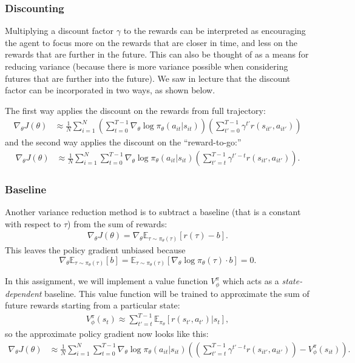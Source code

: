 \documentclass{article}
\begin{document}

\subsubsection{Discounting}
Multiplying a discount factor $\gamma$ to the rewards can be interpreted as encouraging the agent to focus more on the rewards that are closer in time, and less on the rewards that are further in the future. This can also be thought of as a means for reducing variance (because there is more variance possible when considering futures that are further into the future). We saw in lecture that the discount factor can be incorporated in two ways, as shown below.

The first way applies the discount on the rewards from full trajectory:
\begin{align} \label{discount_full}
\nabla_\theta J(\theta) &\approx \frac{1}{N} \sum_{i=1}^N \left(\sum_{t=0}^{T-1} \nabla_\theta \log \pi_\theta(a_{it} | s_{it})\right)\left(\sum_{t'=0}^{T-1} \gamma^{t'} r(s_{it'}, a_{it'})\right)
\end{align}
and the second way applies the discount on the ``reward-to-go:''
\begin{align} \label{discount_rtg}
\nabla_\theta J(\theta) &\approx \frac{1}{N} \sum_{i=1}^N \sum_{t=0}^{T-1} \nabla_\theta \log \pi_\theta(a_{it} | s_{it})\left(\sum_{t'=t}^{T-1} \gamma^{t'-t} r(s_{it'}, a_{it'})\right).
\end{align}


\subsubsection{Baseline}
Another variance reduction method is to subtract a baseline (that is a constant with respect to $\tau$) from the sum of rewards:
\begin{align} \label{constant_wrt_tau}
\nabla_\theta J(\theta) = \nabla_\theta \mathbb{E}_{\tau \sim \pi_\theta(\tau)} \left[r(\tau) - b\right].
\end{align}
This leaves the policy gradient unbiased because $$\nabla_\theta \mathbb{E}_{\tau \sim \pi_\theta(\tau)} \left[b\right] = \mathbb{E}_{\tau \sim \pi_\theta(\tau)} \left[\nabla_\theta \log \pi_\theta(\tau) \cdot b\right] = 0.$$

In this assignment, we will implement a value function $V_\phi^\pi$ which acts as a \textit{state-dependent} baseline. This value function will be trained to approximate the sum of future rewards starting from a particular state:
\begin{align}
V_\phi^\pi(s_t) \approx \sum_{t'=t}^{T-1} \mathbb{E}_{\pi_\theta} \left[r(s_{t'}, a_{t'}) | s_t\right],
\end{align}
so the approximate policy gradient now looks like this:
\begin{align} \label{state_dependent_baseline}
\nabla_\theta J(\theta) &\approx \frac{1}{N} \sum_{i=1}^N \sum_{t=0}^{T-1} \nabla_\theta \log \pi_\theta(a_{it} | s_{it})\left(\left(\sum_{t'=t}^{T-1} \gamma^{t'-t} r(s_{it'}, a_{it'})\right) - V_\phi^\pi\left(s_{it}\right)\right).
\end{align}
\end{document}
